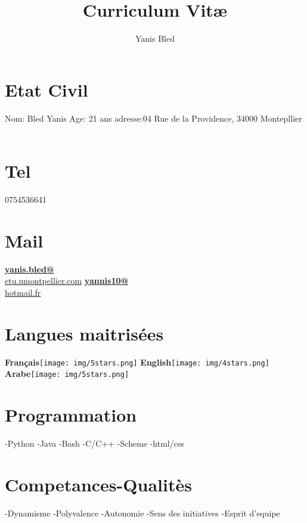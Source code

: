 \documentclass[]{friggeri-cv}
\title{Curriculum Vit\ae}
\author{Yanis Bled}
\begin{document}
\maketitle      
{}


\begin{aside}
    \section{Etat Civil}
    Nom: Bled Yanis
    Age: 21 ans 
    adresse:04 Rue de la Providence, 34000
    Montepllier
    ~
    \section{Tel}
    0754536641
    ~
    \section{Mail}
    \href{mailto:yanis.bled@etu.umontpellier.fr}{\textbf{yanis.bled@}\\etu.umontpellier.com}
    \href{mailto:yannis10@hotmail.fr}{\textbf{yannis10@}\\hotmail.fr}
    ~
    \section{Langues maitrisées}
    \textbf{Français}\texttt{[image: img/5stars.png]}
    \textbf{English}\texttt{[image: img/4stars.png]}
    \textbf{Arabe}\texttt{[image: img/5stars.png]}
    ~
    \section{Programmation}
    -Python
    -Java
    -Bash
    -C/C++
    -Scheme
    -html/css
    ~
    \section{Competances-Qualitès}
    -Dynamisme
    -Polyvalence
    -Autonomie
    -Sens des initiatives
    -Esprit d'equipe
    ~
\end{aside}
\end{document}
